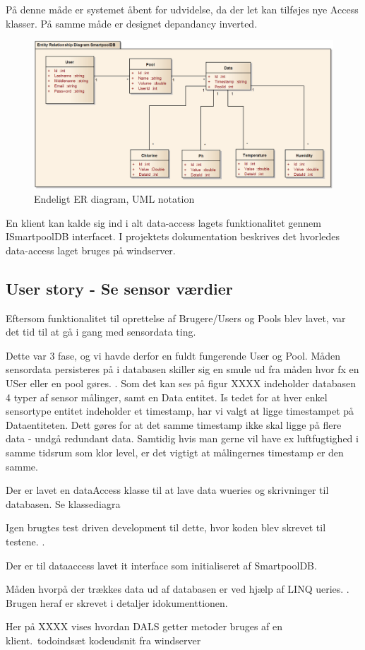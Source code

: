 På denne måde er systemet åbent for udvidelse, da der let kan tilføjes nye Access klasser. På samme måde er designet depandancy inverted.

\begin{figure}[h]
	\centering
	\includegraphics[width=\linewidth]{figs/design/databaseERD_final_uml}
	\caption{Endeligt ER diagram, UML notation}
	\label{fig:databaseERD_final_uml}
\end{figure}

En klient kan kalde sig ind i alt data-access lagets funktionalitet gennem ISmartpoolDB interfacet. I projektets dokumentation  beskrives det hvorledes data-access laget bruges på \gls{windserver}.

\subsection{User story - Se sensor værdier}

Eftersom funktionalitet til oprettelse af Brugere/Users og Pools blev lavet, var  det tid til at gå i gang med sensordata ting.

Dette var 3 fase, og vi havde derfor en fuldt fungerende User og Pool. Måden sensordata persisteres på i databasen skiller sig en smule ud fra måden hvor fx en USer eller en pool gøres. . Som det kan ses på figur XXXX indeholder databasen 4 typer af sensor målinger, samt en Data entitet. Is tedet for at hver enkel sensortype entitet indeholder et timestamp, har vi valgt at ligge timestampet på Dataentiteten. Dett gøres for at det samme timestamp ikke skal ligge på flere data - undgå redundant data.  Samtidig hvis man gerne vil have ex luftfugtighed i samme tidsrum som klor level, er det vigtigt at målingernes timestamp er den samme.

Der er lavet en dataAccess klasse til at lave data wueries og skrivninger til databasen. Se klassediagra 

Igen brugtes test driven development til dette, hvor koden blev skrevet til testene.  .

Der er til dataaccess lavet it interface som initialiseret af SmartpoolDB.

Måden hvorpå der trækkes data ud af databasen er ved hjælp af LINQ ueries. . Brugen heraf er skrevet i detaljer idokumenttionen.

Her på XXXX vises hvordan DALS getter metoder bruges af en klient.\ todo{indsæt kodeudsnit fra windserver}